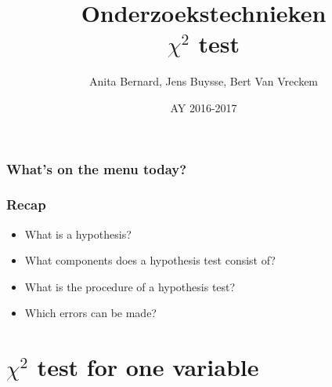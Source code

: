 \documentclass{beamer}
\title[Intro]{Onderzoekstechnieken\\$\chi^{2}$ test}
\author{Anita Bernard, Jens Buysse, Bert {Van Vreckem}}
\date{AY 2016-2017}
\begin{document}

\HoGentLogo

\titleframe





\begin{frame}
  \frametitle{What's on the menu today?}

  \tableofcontents
\end{frame}

\begin{frame}
  \frametitle{Recap}

  \begin{itemize}
    \item What is a hypothesis?
    \item What components does a hypothesis test consist of?
    \item What is the procedure of a hypothesis test?
    \item Which errors can be made?
  \end{itemize}
\end{frame}

\section{$\chi^{2}$ test for one variable}
\sectionframelogo{}
\end{document}
